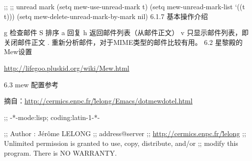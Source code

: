 \documentclass[11pt]{article}
\begin{document}
;; ;; unread mark
(setq mew-use-unread-mark t) 
(setq mew-unread-mark-list `((t t)))
(setq mew-delete-unread-mark-by-mark nil)
6.1.7 基本操作介绍

g       检查邮件
S       排序
a       回复
h       返回邮件列表（从邮件正文）
v       只显示邮件列表，即关闭邮件正文
.       重新分析邮件，对于MIME类型的邮件比较有用。
6.2 星黎殿的Mew设置

\href{http://lifegoo.pluskid.org/wiki/Mew.html}{http://lifegoo.pluskid.org/wiki/Mew.html}

6.3 mew 配置参考

摘自：\href{http://cermics.enpc.fr/~lelong/Emacs/dotmewdotel.html}{http://cermics.enpc.fr/\~lelong/Emacs/dotmewdotel.html}

;; -*-mode:lisp; coding:latin-1-*-

;; Author : Jérôme LELONG
;; address@server
;; \href{http://cermics.enpc.fr/~lelong}{http://cermics.enpc.fr/\~lelong}
;; Unlimited permission is granted to use, copy, distribute, and/or
;; modify this program.  There is NO WARRANTY.
\end{document}
